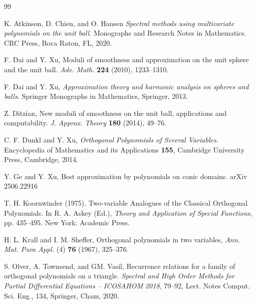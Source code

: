 \documentclass{amsart}
\theoremstyle{remark}
\begin{document}
\begin{thebibliography}{99}
      
       K. Atkinson, D. Chien, and O. Hansen
       {\it Spectral methods using multivariate polynomials on the unit ball.}
       Monographs and Research Notes in Mathematics. CRC Press, Boca Raton, FL, 2020.

       F. Dai and Y. Xu,
       Moduli of smoothness and approximation on the unit sphere and the unit ball. 
       \textit{Adv. Math.} \textbf{224} (2010), 1233--1310.

       F. Dai and Y. Xu,
       \textit{Approximation theory and harmonic analysis on spheres and balls}.
       Springer Monographs in Mathematics, Springer, 2013. 

       Z. Ditzian, 
       New moduli of smoothness on the unit ball, applications and computability. 
       \textit{J. Approx. Theory} \textbf{180} (2014), 49--76.

        C. F. Dunkl and Y. Xu,
        \textit{Orthogonal Polynomials of Several Variables}.
        Encyclopedia of Mathematics and its Applications \textbf{155},
        Cambridge University Press, Cambridge, 2014.
        
         Y. Ge and Y. Xu, Best approximation by polynomials on conic domains. 
         arXiv 2506.22916

         T. H. Koornwinder (1975). 
         Two-variable Analogues of the Classical Orthogonal Polynomials. 
         In R. A. Askey (Ed.), \textit{Theory and Application of Special Functions}, pp. 435--495. 
         New York: Academic Press.

         H. L. Krall and I. M. Sheffer, 
         Orthogonal polynomials in two variables, 
         \textit{Ann. Mat. Pura Appl.} (4) \textbf{76} (1967), 325--376.


        S. Olver, A. Townsend, and GM. Vasil,
        Recurrence relations for a family of orthogonal polynomials on a triangle.
        \textit{Spectral and High Order Methods for Partial Differential Equations -- ICOSAHOM 2018}, 79--92, 
        Lect. Notes Comput. Sci. Eng., 134, Springer, Cham, 2020.


\end{thebibliography}
\end{document}
